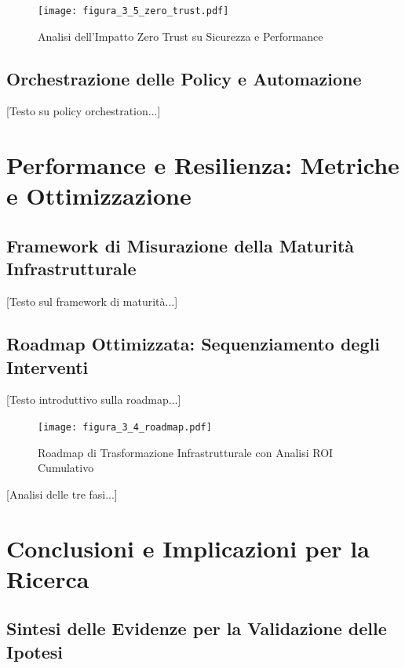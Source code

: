 \begin{figure}[htbp]
\centering
\texttt{[image: figura\_3\_5\_zero\_trust.pdf]}
\caption{Analisi dell'Impatto Zero Trust su Sicurezza e Performance}
\label{fig:zero_trust_impact}
\end{figure}

\subsection{Orchestrazione delle Policy e Automazione}

[Testo su policy orchestration...]

\section{Performance e Resilienza: Metriche e Ottimizzazione}

\subsection{Framework di Misurazione della Maturità Infrastrutturale}

[Testo sul framework di maturità...]

\subsection{Roadmap Ottimizzata: Sequenziamento degli Interventi}

[Testo introduttivo sulla roadmap...]

\begin{figure}[htbp]
\centering
\texttt{[image: figura\_3\_4\_roadmap.pdf]}
\caption{Roadmap di Trasformazione Infrastrutturale con Analisi ROI Cumulativo}
\label{fig:transformation_roadmap}
\end{figure}

[Analisi delle tre fasi...]

\section{Conclusioni e Implicazioni per la Ricerca}

\subsection{Sintesi delle Evidenze per la Validazione delle Ipotesi}

